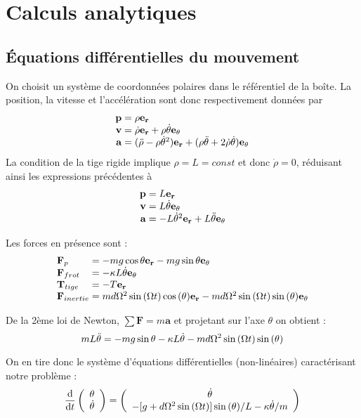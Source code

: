 \documentclass[a4paper,12pt,oneside]{article}
\def \be {\begin{equation}}
\def \ee {\end{equation}}
\def \dd  {{\rm d}}
\def \t {\theta}
\def \vt {\Dot{\theta}}
\begin{document}
\section{Calculs analytiques}


\subsection{Équations différentielles du mouvement}

On choisit un système de coordonnées polaires dans le référentiel de la boîte. La position, la vitesse et l'accélération sont donc respectivement données par 
\setlength\arraycolsep{0pt}
\[
\begin{array}{r @{{}={}} l}
\mathbf{p} & \rho \mathbf{e_r} \\
\mathbf{v} & \Dot{\rho} \mathbf{e_r} + \rho\vt \mathbf{e_\t} \\
\mathbf{a} & (\Ddot{\rho} - \rho \vt^2) \mathbf{e_r} + (\rho \Ddot{\t} + 2 \Dot{\rho} \vt) \mathbf{e_\t}
\end{array}
\]
La condition de la tige rigide implique $\rho = L = const$ et donc $\Dot{\rho}=0$, réduisant ainsi les expressions précédentes à 
\[
\begin{array}{r @{{}={}} l}
\mathbf{p} & L \mathbf{e_r} \\
\mathbf{v} & L\vt \mathbf{e_\t} \\
\mathbf{a} & - L \vt^2 \mathbf{e_r} + L \Ddot{\t} \mathbf{e_\t}
\end{array}
\]

Les forces en présence sont :
\[
\begin{array}{l @{{}={}} l}
\mathbf{F}_p & - mg \cos{\t} \mathbf{e_r} - mg \sin{\t} \mathbf{e_\t} \\
\mathbf{F}_{frot} & -\kappa L \vt \mathbf{e_\t} \\
\mathbf{T}_{tige} & -T \mathbf{e_r} \\
\mathbf{F}_{inertie} & m d \Omega^2 \sin{(\Omega t)}\cos{(\t)} \mathbf{e_r} - m d \Omega^2 \sin{(\Omega t)}\sin{(\t)} \mathbf{e_\t}
\end{array}
\]

De la 2ème loi de Newton, $\sum \textbf{F}=m\textbf{a}$ et projetant sur l'axe $\t$ on obtient :
\be
mL \Ddot{\t} = - mg \sin{\t} - \kappa L \vt - m d \Omega^2 \sin{(\Omega t)}\sin{(\t)}
\ee

On en tire donc le système d'équations différentielles (non-linéaires) caractérisant notre problème :
\be
\frac{\dd }{\dd t} 
\left( \begin{array}{c} \t \\ \vt  \end{array} \right)
=
\left( \begin{array}{c}
   \vt \\
   -[g+d\Omega^2\sin{(\Omega t)}]\sin{(\t)}/L - \kappa\vt/m
\end{array} \right)
\label{eq1}
\ee
\end{document}
